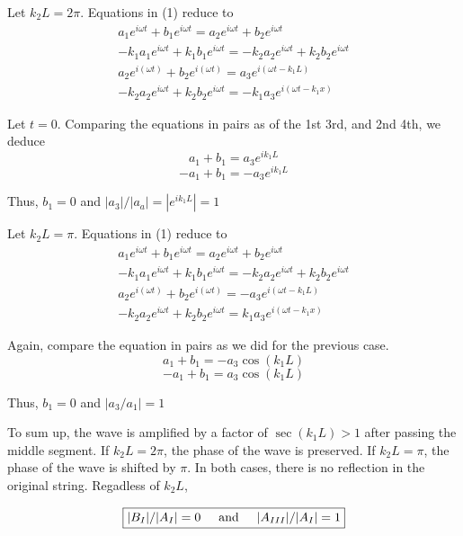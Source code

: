 \documentclass{article}
\newcommand{\textAnd}{
    {
        \hspace{5mm}
        \textrm{and}
        \hspace{5mm}
    }
}
\newcommand{\Ixp}[1]{
    {
        e^{i{#1}}
    }
}
\begin{document}
Let $k_2 L = 2\pi$. Equations in (1) reduce to 
\begin{align}
    a_1 \Ixp{\omega t} + b_1 \Ixp{\omega t}
     = a_2 \Ixp {\omega t} + b_2 \Ixp{\omega t}
    \nonumber \\
    -k_1a_1 \Ixp{\omega t} + k_1b_1 \Ixp{\omega t}
     = -k_2 a_2 \Ixp{\omega t} + k_2 b_2 \Ixp{\omega t}
    \nonumber  \\
     a_2 \Ixp{(\omega t)} + b_2 \Ixp{(\omega t)}
     = 
     a_3 \Ixp{(\omega t - k_1 L)}
    \nonumber \\
     -k_2a_2 \Ixp {\omega t }+ k_2b_2 \Ixp{\omega t }
     = 
     -k_1 a_3 \Ixp{(\omega t - k_1 x)}
\end{align}

Let $t = 0$. 
Comparing the equations in pairs as of the 1st 3rd, and 2nd 4th, we deduce 
\[
    a_1 + b_1 = a_3 \Ixp{k_1 L}
\]
\[
    -a_1 + b_1 = -a_3 \Ixp{k_1 L}
\]

Thus, $b_1 = 0$ and $|a_3|/|a_a| = |\Ixp{k_1L}| = 1$

Let $k_2 L = \pi$. Equations in (1) reduce to
\begin{align}
    a_1 \Ixp{\omega t} + b_1 \Ixp{\omega t}
     = a_2 \Ixp {\omega t} + b_2 \Ixp{\omega t}
    \nonumber \\
    -k_1a_1 \Ixp{\omega t} + k_1b_1 \Ixp{\omega t}
     = -k_2 a_2 \Ixp{\omega t} + k_2 b_2 \Ixp{\omega t}
    \nonumber  \\
     a_2 \Ixp{(\omega t)} + b_2 \Ixp{(\omega t)}
     = 
     -a_3 \Ixp{(\omega t - k_1 L)}
    \nonumber \\
     -k_2a_2 \Ixp {\omega t }+ k_2b_2 \Ixp{\omega t }
     = 
     k_1 a_3 \Ixp{(\omega t - k_1 x)}
\end{align}



Again, compare the equation in pairs as we did for the previous case. 
\[
    a_1 + b_1 = -a_3 \cos(k_1 L)
\]
\[
    -a_1 + b_1 = a_3 \cos(k_1 L)
\]

Thus, $b_1 = 0$ and $|a_3/a_1| = 1$

To sum up, the wave is amplified by a factor of $\sec(k_1 L) > 1$ 
after passing the middle segment. If $k_2L = 2\pi$, the phase 
of the wave is preserved. If $k_2 L = \pi$, the phase of the wave 
is shifted by $\pi$. In both cases, there is no reflection in the 
original string. Regadless of $k_2 L$, 

\[
    \boxed{
        |B_I|/|A_I| = 0
        \textAnd 
        |A_{III}|/|A_I| = 1
    }
\]
\end{document}
